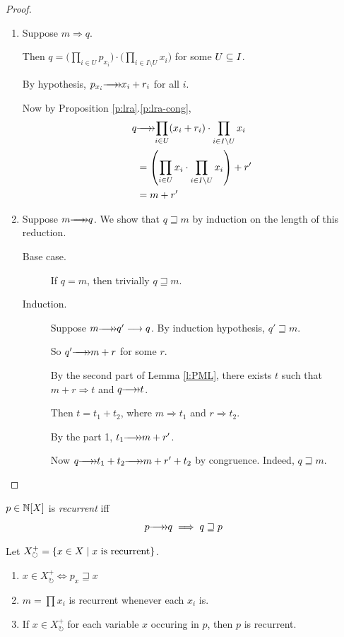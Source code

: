 \documentclass[numbers=enddot]{scrartcl}
\newcommand{\Xcyc}{X_{\circlearrowright}}
\newcommand{\LRA}{\Longrightarrow}
\newcommand{\cov}{\sqsupseteq}
\begin{document}
\begin{proof} \hfill
  \begin{enumerate}
  \item Suppose $m \LRA q$.

  Then $q = \big(\prod_{i \in U} p_{x_i} \big) \cdot \big(\prod_{i \in I \setminus U} x_i\big)$ for some $U \subseteq I$.

  By hypothesis, $p_{x_i} \thra x_i + r_i$ for all $i$.

  Now by Proposition \ref{p:lra}.\ref{p:lra-cong},
  \begin{align*}
    q &\thra \prod_{i \in U} (x_i + r_i) \cdot \prod_{i \in I \setminus U} x_i \\
    &= \left(\prod_{i \in U} x_i  \cdot \prod_{i \in I \setminus U} x_i\right) + r' \\
    &= m + r'
  \end{align*}

  \item
  Suppose $m \thra q$. We show that $q \cov m$ by induction on the length of this reduction.

\begin{description}
  \item[Base case.]
  If $q = m$, then trivially $q \cov m$.
  \item[Induction.]
  Suppose  $m \thra q' \lra q$.  By induction hypothesis, $q' \cov m$.

  So $q' \thra m + r$ for some $r$.

  By the second part of Lemma \ref{l:PML}, there exists $t$ such that
   $m + r \LRA t$ and $q \thra t$.

   Then $t = t_1 + t_2$, where $m \LRA t_1$ and $r \LRA t_2$.

   By the part 1, $t_1 \thra m + r'$.

   Now $q \thra t_1 + t_2 \thra m + r' + t_2$ by congruence.  Indeed, $q \cov m$. \qedhere
\end{description}
\end{enumerate}
\end{proof}

\begin{dfn}
  $p \in \mathbb{N}[X]$ is \emph{recurrent} iff
  \[ p \thra q \implies q \cov p \]
\end{dfn}

\newcommand{\Xsc}{\Xcyc^+}
Let $\Xsc = \setof{x \in X \mid x \text{ is recurrent}}$.

\begin{cor} \label{p:sc=cov} \hfill
  \begin{enumerate}
    \item
    $x \in \Xsc \iff p_x \cov x$
    \item
    $m = \prod {x_i}$ is recurrent whenever each $x_i$ is.
    \item
    If $x \in \Xsc$ for each variable $x$ occuring in $p$, then $p$ is recurrent.
  \end{enumerate}
\end{cor}
\end{document}
